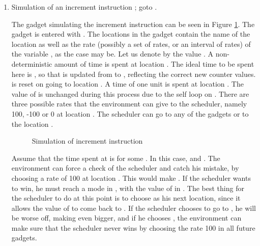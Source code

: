 \begin{enumerate}
\item Simulation of an increment instruction ;  goto  . 

The gadget simulating the increment  instruction can be seen in Figure \ref{inc-c1}.
The gadget is entered with . The 
locations in the gadget contain the name of the location as well as 
the rate (possibly a set of rates, or an interval of rates)  of the variable , as the case may be. 
Let us denote by  the value . 
A non-deterministic amount of time is spent at location . 
The ideal time to be spent here is , so that 
  is updated from  to , reflecting 
 the correct new counter values.  is reset on 
 going to location . A time of one unit is spent at location .
 The value of  is unchanged during this process due to the self loop 
 on . There are three possible rates that the environment can 
 give to the scheduler, namely 100, -100 or 0 at location . 
 The scheduler can go to any of the gadgets  or to the location  . 
   

\begin{figure}[h]
\begin{center}
\caption{Simulation of increment  instruction }
\label{inc-c1}
\end{center}
\end{figure}

Assume that the time spent at  is  for some .
In this case,  and . The environment
can force a check of the scheduler and catch his mistake, by choosing a rate of 100 at location .
 This would make . If the scheduler wants to win, 
 he must reach a mode in , with the value of  
 in . The best thing for the scheduler to do at this point
 is to choose   as his next location, since 
 it allows the value of  to come back to . 
 If the scheduler chooses to go to , he will be worse off, making  even bigger, 
 and if he chooses , the environment can make sure that 
 the scheduler never wins by choosing the rate 100 in all future gadgets.  


\end{enumerate}
